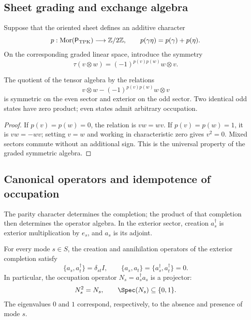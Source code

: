 \subsection{Sheet grading and exchange algebra}
\label{v:rec:completaciones:section:04}

Suppose that the oriented sheet defines an additive character
\[
 p:\operatorname{Mor}(\mathsf P_{\rm TPK})\longrightarrow\mathbb Z/2\mathbb Z,
 \qquad p(\gamma\eta)=p(\gamma)+p(\eta).
\]
On the corresponding graded linear space, introduce the symmetry
\[
 \tau(v\otimes w)=(-1)^{p(v)p(w)}w\otimes v.
\]

\begin{theorem}
\label{v:rec:completaciones:statement:02}
The quotient of the tensor algebra by the relations
\[
 v\otimes w-(-1)^{p(v)p(w)}w\otimes v
\]
is symmetric on the even sector and exterior on the odd sector. Two identical
odd states have zero product; even states admit arbitrary
occupation.
\end{theorem}

\begin{proof}
If \(p(v)=p(w)=0\), the relation is \(vw=wv\). If
\(p(v)=p(w)=1\), it is \(vw=-wv\); setting \(v=w\) and working in
characteristic zero gives \(v^2=0\). Mixed sectors commute without
an additional sign. This is the universal property of the graded symmetric
algebra.
\end{proof}

\subsection{Canonical operators and idempotence of occupation}
\label{v:pauli:car-construccion}

The parity character determines the completion; the product of that
completion then determines the operator algebra. In the
exterior sector, creation \(a_s^\dagger\) is exterior multiplication by
\(e_s\), and \(a_s\) is its adjoint.

\begin{theorem}
\label{v:rec:completaciones:statement:01}
\label{v:rec:thm:principio-exclusion-pauli}
For every mode \(s\in S\), the creation and annihilation operators of the
exterior completion satisfy
\begin{equation}
 \{a_s,a_t^\dagger\}=\delta_{st}I,
 \qquad
 \{a_s,a_t\}=\{a_s^\dagger,a_t^\dagger\}=0.
 \label{v:pauli:eq:car}
\end{equation}
In particular, the occupation operator
\(N_s=a_s^\dagger a_s\) is a projector:
\begin{equation}
 N_s^2=N_s,
 \qquad \Spec(N_s)\subseteq\{0,1\}.
 \label{v:pauli:eq:proyeccion-ocupacion}
\end{equation}
The eigenvalues \(0\) and \(1\) correspond, respectively, to the absence
and presence of mode \(s\).
\end{theorem}

